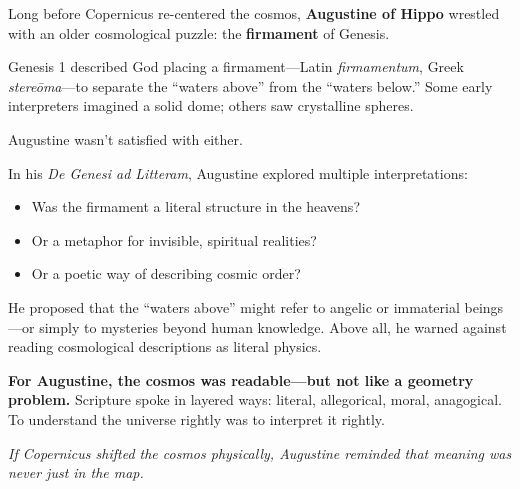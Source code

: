 \begin{tcolorbox}[title=Augustine’s Firmament: Between Scripture and Cosmos, colback=gray!5, colframe=black, fonttitle=\bfseries]

  Long before Copernicus re-centered the cosmos, \textbf{Augustine of Hippo} wrestled with an older cosmological puzzle: the \textbf{firmament} of Genesis.
  
  Genesis 1 described God placing a firmament—Latin \emph{firmamentum}, Greek \emph{stereōma}—to separate the “waters above” from the “waters below.” Some early interpreters imagined a solid dome; others saw crystalline spheres.
  
  Augustine wasn’t satisfied with either.
  
  In his \emph{De Genesi ad Litteram}, Augustine explored multiple interpretations:
  
  \begin{itemize}
    \item Was the firmament a literal structure in the heavens?
    \item Or a metaphor for invisible, spiritual realities?
    \item Or a poetic way of describing cosmic order?
  \end{itemize}
  
  He proposed that the “waters above” might refer to angelic or immaterial beings—or simply to mysteries beyond human knowledge. Above all, he warned against reading cosmological descriptions as literal physics.
  
  \medskip
  
  \textbf{For Augustine, the cosmos was readable—but not like a geometry problem.} Scripture spoke in layered ways: literal, allegorical, moral, anagogical. To understand the universe rightly was to interpret it rightly.
  
  \medskip
  
  \begin{center}
  \emph{If Copernicus shifted the cosmos physically, Augustine reminded that meaning was never just in the map.}
  \end{center}
  
  \end{tcolorbox}
